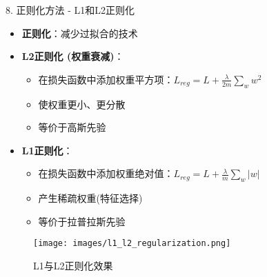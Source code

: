 \documentclass[
  ignorenonframetext,
  aspectratio=169,
  chinese-hans,
]{beamer}
\providecommand{\tightlist}{%
  \setlength{\itemsep}{0pt}\setlength{\parskip}{0pt}}\usepackage{longtable,booktabs,array}
\begin{document}
\begin{frame}{8. 正则化方法 - L1和L2正则化}
\label{ux6b63ux5219ux5316ux65b9ux6cd5---l1ux548cl2ux6b63ux5219ux5316}
\begin{itemize}
\item
  \textbf{正则化}：减少过拟合的技术
\item
  \textbf{L2正则化 (权重衰减)}：

  \begin{itemize}
  \tightlist
  \item
    在损失函数中添加权重平方项：\(L_{reg} = L + \frac{\lambda}{2m}\sum_{w}w^2\)
  \item
    使权重更小、更分散
  \item
    等价于高斯先验
  \end{itemize}
\item
  \textbf{L1正则化}：

  \begin{itemize}
  \tightlist
  \item
    在损失函数中添加权重绝对值：\(L_{reg} = L + \frac{\lambda}{m}\sum_{w}|w|\)
  \item
    产生稀疏权重(特征选择)
  \item
    等价于拉普拉斯先验
  \end{itemize}
\end{itemize}

\begin{figure}[H]

{\centering \texttt{[image: images/l1\_l2\_regularization.png]}

}

\caption{L1与L2正则化效果}

\end{figure}%
\end{frame}
\end{document}
